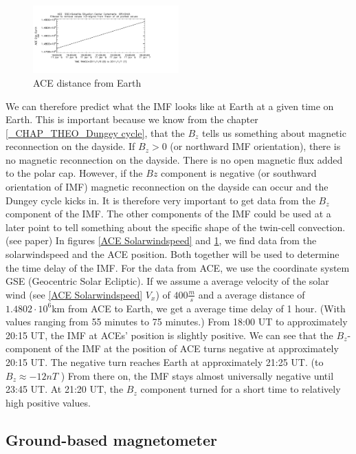 \documentclass[10pt,a4paper]{article}
\begin{document}
\begin{figure}[h]
\centering
\includegraphics[width=0.5\textwidth]{ACE_distance.pdf}
\caption{ ACE distance from Earth \label{ACE distance}}
\end{figure}
We can therefore predict what the IMF looks like at Earth at a given time on Earth. This is important because we know from the chapter \ref{_CHAP_THEO_Dungey cycle}, that the $B_z$ tells us something about magnetic reconnection on the dayside. If $B_z>0$ (or northward IMF orientation), there is no magnetic reconnection on the dayside. There is no open magnetic flux added to the polar cap. However, if the $Bz$ component is negative (or southward orientation of IMF) magnetic reconnection on the dayside can occur and the Dungey cycle kicks in. It is therefore very important to get data from the $B_z$ component of the IMF. The other components of the IMF could be used at a later point to tell something about the specific shape of the twin-cell convection.(see paper\cite{paper2}) In figures \ref{ACE Solarwindspeed} and \ref{ACE distance}, we find data from the solarwindspeed and the ACE position. Both together will be used to determine the time delay of the IMF. For the data from ACE, we use the coordinate system GSE (Geocentric Solar Ecliptic). If we assume a average velocity of the solar wind (see \ref{ACE Solarwindspeed} $V_x$) of $400 \frac{m}{s}$ and a average distance of $1.4802 \cdot 10^{6} \mathrm{km}$ from ACE to Earth, we get a average time delay of 1 hour. (With values ranging from 55 minutes to 75 minutes.) From 18:00 UT to approximately 20:15 UT, the IMF at ACEs' position is slightly positive. We can see that the $B_z$-component of the IMF at the position of ACE turns negative at approximately 20:15 UT. The negative turn reaches Earth at approximately 21:25 UT.  
(to $B_z\approx-12 n T$ ) From there on, the IMF stays almost universally negative until 23:45 UT. At 21:20 UT, the $B_z$ component turned for a short time to relatively high positive values. 



\subsection{Ground-based magnetometer\label{0_CHAPTER_GROUNDBASEDMag}}
\end{document}
